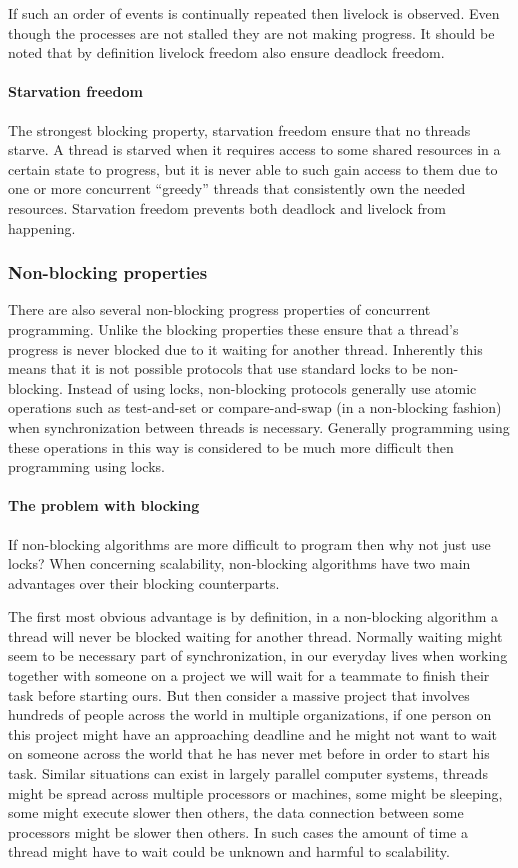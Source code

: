 

If such an order of events is continually repeated then livelock is observed.
Even though the processes are not stalled they are not making progress.
It should be noted that by definition livelock freedom also ensure deadlock freedom.

\paragraph{Starvation freedom}
The strongest blocking property, starvation freedom ensure that no threads starve.
A thread is starved when it requires access to some shared resources in a certain state to progress, but
it is never able to such gain access to them due to one or more concurrent ``greedy'' threads
that consistently own the needed resources.
Starvation freedom prevents both deadlock and livelock from happening.


\subsubsection{Non-blocking properties}
There are also several non-blocking progress properties of concurrent programming.
Unlike the blocking properties these ensure that a thread's progress is never blocked
due to it waiting for another thread.
Inherently this means that it is not possible protocols that use standard locks
to be non-blocking.
Instead of using locks, non-blocking protocols generally use atomic operations
such as test-and-set or compare-and-swap (in a non-blocking fashion) when synchronization between threads is necessary.
Generally programming using these operations in this way is considered to be much more difficult then
programming using locks.

\paragraph{The problem with blocking}
If non-blocking algorithms are more difficult to program then why not just use locks?
When concerning scalability, non-blocking algorithms have two main advantages over their blocking counterparts.

The first most obvious advantage is by definition, in a non-blocking algorithm a thread will never be blocked
waiting for another thread.
Normally waiting might seem to be necessary part of synchronization, in our everyday lives when working together
with someone on a project we will wait for a teammate to finish their task before starting ours.
But then consider a massive project that involves hundreds of people across the world in multiple organizations,
if one person on this project might have an approaching deadline and he might not want to wait on someone across the
world that he has never met before in order to start his task.
Similar situations can exist in largely parallel computer systems, threads might be spread across multiple
processors or machines, some might be sleeping, some might execute slower then others, the data connection between
some processors might be slower then others.
In such cases the amount of time a thread might have to wait could be unknown and harmful to scalability.

